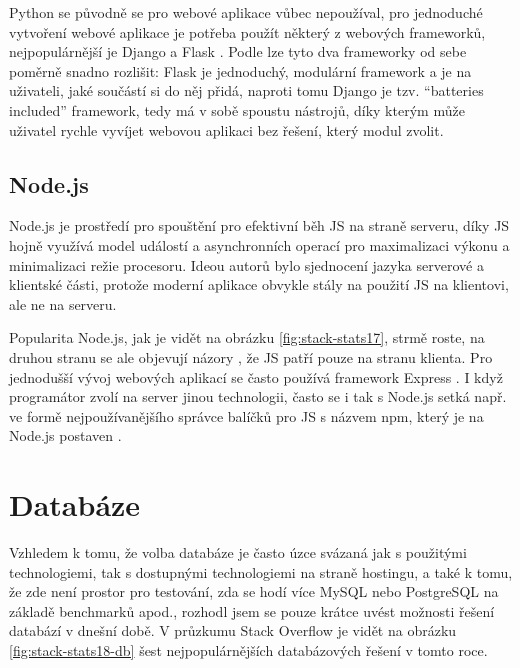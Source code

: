         Python se původně se pro webové aplikace vůbec nepoužíval, pro jednoduché vytvoření webové aplikace je potřeba použít některý z webových frameworků, nejpopulárnější je Django a Flask \cite{tech-python4}. Podle \cite{tech-python5} lze tyto dva frameworky od sebe poměrně snadno rozlišit: Flask je jednoduchý, modulární framework a je na uživateli, jaké součástí si do něj přidá, naproti tomu Django je tzv. \enquote{batteries included} framework, tedy má v sobě spoustu nástrojů, díky kterým může uživatel rychle vyvíjet webovou aplikaci bez řešení, který modul zvolit.
        
        \subsection{Node.js}\label{nodejs}
        Node.js je prostředí pro spouštění pro efektivní běh JS na straně serveru, díky JS hojně využívá model událostí a asynchronních operací pro maximalizaci výkonu a minimalizaci režie procesoru. Ideou autorů bylo sjednocení jazyka serverové a klientské části, protože moderní aplikace obvykle stály na použití JS na klientovi, ale ne na serveru. \cite{tech1}
        
        Popularita Node.js, jak je vidět na obrázku \ref{fig:stack-stats17}, strmě roste, na druhou stranu se ale objevují názory \cite{tech-node1}, že JS patří pouze na stranu klienta. Pro jednodušší vývoj webových aplikací se často používá framework Express \cite{tech-node2}. I když programátor zvolí na server jinou technologii, často se i tak s Node.js setká např. ve formě nejpoužívanějšího správce balíčků pro JS s názvem npm, který je na Node.js postaven \cite{tech1}.


    \section{Databáze}
    Vzhledem k tomu, že volba databáze je často úzce svázaná jak s použitými technologiemi, tak s dostupnými technologiemi na straně hostingu, a také k tomu, že zde není prostor pro testování, zda se hodí více MySQL nebo PostgreSQL na základě benchmarků apod., rozhodl jsem se pouze krátce uvést možnosti řešení databází v dnešní době. V průzkumu Stack Overflow \cite{stack-stats18} je vidět na obrázku \ref{fig:stack-stats18-db} šest nejpopulárnějších databázových řešení v tomto roce.
    
